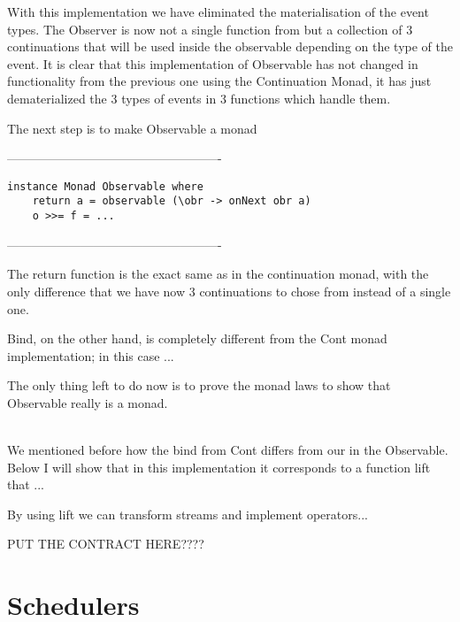 With this implementation we have eliminated the materialisation of the event types. The Observer is now not a single function from  but a collection of 3 continuations that will be used inside the observable depending on the type of the event. It is clear that this implementation of Observable has not changed in functionality from the previous one using the Continuation Monad, it has just dematerialized the 3 types of events in 3 functions which handle them.

The next step is to make Observable a monad

----------------------------------------------------
\begin{verbatim}
instance Monad Observable where
	return a = observable (\obr -> onNext obr a)
	o >>= f = ...
\end{verbatim}
----------------------------------------------------  

The return function is the exact same as in the continuation monad, with the only difference that we have now 3 continuations to chose from instead of a single one. 

Bind, on the other hand, is completely different from the Cont monad implementation; in this case ... 

The only thing left to do now is to prove the monad laws to show that Observable really is a monad.

\\

We mentioned before how the bind from Cont differs from our in the Observable. Below I will show that in this implementation it corresponds to a function lift that ... 

By using lift we can transform streams and implement operators...


PUT THE CONTRACT HERE????

\section{Schedulers}



